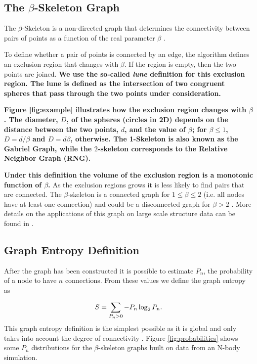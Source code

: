 \documentclass[fleqn,usenatbib]{mnras}
\begin{document}
\subsection{The $\beta$-Skeleton Graph}

The $\beta$-Skeleton is a non-directed graph that determines the
connectivity between pairs of points as a function of the real
parameter $\beta$ \citep{1985Kirkpatrick}. 

To define whether a pair of points is connected by an edge, the
algorithm defines an exclusion region that changes with $\beta$.  
If the region is empty, then the two points are joined.
\textbf{We use the so-called \emph{lune} definition for this exclusion region.
The lune is defined as the intersection of two congruent spheres that
pass through the two points under consideration.}

\textbf{Figure \ref{fig:example} illustrates how the exclusion region changes
with $\beta$.
The diameter, $D$, of the spheres (circles in 2D) depends on the
distance between the two points, $d$, and the value of $\beta$; for
$\beta \leq 1$, $D=d/\beta$ and $D=d\beta$, otherwise.
The 1-Skeleton is also known as the Gabriel Graph, while the
$2$-skeleton corresponds to the Relative Neighbor Graph (RNG). }

\textbf{Under this definition the volume of the exclusion region is a
monotonic function of $\beta$.}
As the exclusion regions grows it is less likely to find pairs that are connected.
The $\beta$-skeleton is a connected graph for $1\leq \beta\leq 2$
(i.e. all nodes have at least
one connection) and could be a disconnected graph for $\beta>2$ \citep{bose2002spanning}.
More details on the applications of this graph on large scale structure data
can be found in \citep{2019MNRAS.485.5276F}.

\subsection{Graph Entropy Definition}

After the graph has been constructed it is possible to estimate $P_n$, the probability of 
a node to have $n$ connections.
From these values we define the graph entropy as

\begin{equation}
\centering
    S = \displaystyle\sum_{P_n>0}-P_n\log_2{P_n}.
    \label{ecuacionEntropia}
\end{equation}
%
This graph entropy definition is the simplest possible as it is global and only 
takes into account the degree of connectivity \citep{2012Entrp..14..559M}. 
Figure \ref{fig:probabilities} shows some $P_n$ distributions for the 
$\beta$-skeleton graphs built on data from an N-body simulation.
\end{document}
